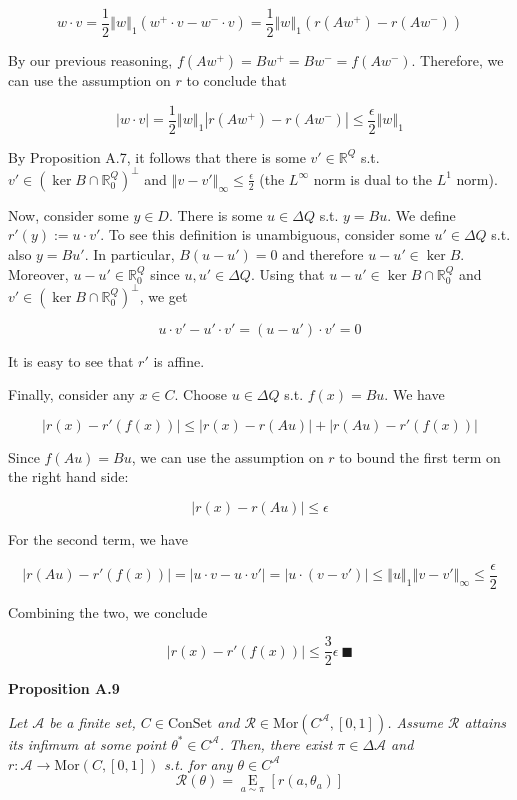 \documentclass[a4paper]{article}
\newcommand{\Co}[1]{}
\newcommand{\AP}[1]{\left(#1\right)}
\newcommand{\AB}[1]{\left[#1\right]}
\newcommand{\Abs}[1]{\left\vert #1 \right\vert}
\newcommand{\Norm}[1]{\left\Vert #1 \right\Vert}
\newcommand{\Ea}[2]{\underset{#1}{\operatorname{E}}\AB{#2}}
\newcommand{\Reals}{\mathbb{R}}
\DeclareMathOperator{\Ker}{ker}
\newcommand{\Mor}{\mathrm{Mor}}
\newcommand{\A}{\mathcal{A}}
\newcommand{\R}{\mathcal{R}}
\newcommand{\Con}{{\boldsymbol{\mathrm{ConSet}}}}
\begin{document}
$$w\cdot v=\frac{1}{2}\Norm{w}_1\AP{w^+\cdot v - w^-\cdot v}=\frac{1}{2}\Norm{w}_1\AP{r\AP{Aw^+}-r\AP{Aw^-}}$$

By our previous reasoning, $f\AP{Aw^+}=Bw^+=Bw^-=f\AP{Aw^-}$. Therefore, we can use the assumption on $r$ to conclude that

$$\Abs{w\cdot v}=\frac{1}{2}\Norm{w}_1\Abs{r\AP{Aw^+}-r\AP{Aw^-}}\leq\frac{\epsilon}{2}\Norm{w}_1$$

By Proposition A.7, it follows that there is some $v'\in\Reals^Q$ s.t. $v'\in\AP{\Ker B\cap\Reals^Q_0}^\bot$ and $\Norm{v-v'}_\infty\leq\frac{\epsilon}{2}$ (the $L^\infty$ norm is dual to the $L^1$ norm). 

Now, consider some $y\in D$. There is some $u\in\Delta Q$ s.t. $y=Bu$. We define $r'(y):=u\cdot v'$. To see this definition is unambiguous, consider some $u'\in\Delta Q$ s.t. also $y=Bu'$. In particular, $B\AP{u-u'}=0$ and therefore $u-u'\in\Ker B$. Moreover, $u-u'\in\Reals^Q_0$ since $u,u'\in\Delta Q$. Using that $u-u'\in\Ker B\cap\Reals^Q_0$ and $v'\in\AP{\Ker B\cap\Reals^Q_0}^\bot$, we get

$$u\cdot v'-u'\cdot v'=\AP{u-u'}\cdot v'=0$$

It is easy to see that $r'$ is affine. 

Finally, consider any $x\in C$. Choose $u\in\Delta Q$ s.t. $f(x)=Bu$. We have

$$\Big\lvert{r(x)-r'\AP{f(x)}}\Big\rvert\leq\Big\lvert{r(x)-r\AP{Au}}\Big\rvert+\Abs{r\AP{Au}-r'\AP{f(x)}}$$

Since $f\AP{Au}=Bu$, we can use the assumption on $r$ to bound the first term on the right hand side:

$$\Big\lvert{r(x)-r\AP{Au}}\Big\rvert\leq\epsilon$$

For the second term, we have

$$\Abs{r\AP{Au}-r'\AP{f(x)}}=\Big\lvert{u\cdot v-u\cdot v'}\Big\rvert=\Big\lvert{u\cdot\AP{v-v'}}\Big\rvert\leq\Norm{u}_1\Norm{v-v'}_\infty\leq\frac{\epsilon}{2}$$

Combining the two, we conclude

$$\Big\lvert{r(x)-r'\AP{f(x)}}\Big\rvert\leq\frac{3}{2}\epsilon\ \blacksquare$$

\textbf{Proposition A.9}\Co{b}

\textit{Let $\A$ be a finite set, $C\in\Con$ and $\R\in\Mor\AP{C^\A,[0,1]}$. Assume $\R$ attains its infimum at some point $\theta^*\in C^\A$. Then, there exist $\pi\in\Delta\A$ and $r:\A\rightarrow\Mor\AP{C,[0,1]}$ s.t. for any $\theta\in C^\A$}\Co{i} 
$$\R(\theta)=\Ea{a\sim\pi}{r\AP{a,\theta_a}}$$
\end{document}
